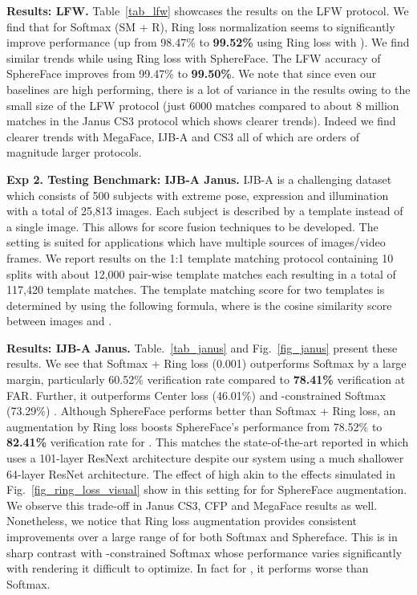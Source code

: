 \documentclass[10pt,twocolumn,letterpaper]{article}
\begin{document}
\textbf{Results: LFW.}  Table~\ref{tab_lfw} showcases the results on the LFW protocol. We find that for Softmax (SM + R), Ring loss normalization seems to significantly improve performance (up from 98.47\% to \textbf{99.52\%} using Ring loss with ). We find similar trends while using Ring loss with SphereFace. The LFW accuracy of SphereFace improves from 99.47\% to \textbf{99.50\%}. We note that since even our baselines are high performing, there is a lot of variance in the results owing to the small size of the LFW protocol (just 6000 matches compared to about 8 million matches in the Janus CS3 protocol which shows clearer trends). Indeed we find clearer trends with MegaFace, IJB-A and CS3 all of which are orders of magnitude larger protocols.











\textbf{Exp 2. Testing Benchmark: IJB-A Janus.} IJB-A \cite{klare2015pushing} is a challenging dataset which consists of 500 subjects with  extreme pose, expression and illumination with a total of 25,813 images. Each subject is described by a template instead of a single image. This allows for score fusion techniques to be developed. The setting is suited for applications which have multiple sources of images/video frames. We report results on the 1:1 template matching protocol containing 10 splits with about 12,000 pair-wise template matches each resulting in a total of 117,420 template matches. The template matching score for two templates  is determined by using the following formula,  where  is the cosine similarity score between images  and . 




\textbf{Results: IJB-A Janus.} Table.~\ref{tab_janus} and Fig.~\ref{fig_janus} present these results. We see that Softmax + Ring loss (0.001) outperforms Softmax by a large margin, particularly 60.52\% verification rate compared to \textbf{78.41\%} verification at  FAR. Further, it outperforms Center loss \cite{wen2016discriminative} (46.01\%) and -constrained Softmax (73.29\%)  \cite{ranjan2017l2}. Although SphereFace performs better than Softmax + Ring loss, an augmentation by Ring loss boosts SphereFace's performance from 78.52\% to \textbf{82.41\%} verification rate for . This matches the state-of-the-art reported in \cite{ranjan2017l2} which uses a 101-layer ResNext architecture despite our system using a much shallower 64-layer ResNet architecture. The effect of high  akin to the effects simulated in Fig.~\ref{fig_ring_loss_visual} show in this setting for  for SphereFace augmentation. We observe this trade-off in Janus CS3, CFP and MegaFace results as well. Nonetheless, we notice that Ring loss augmentation provides consistent improvements over a large range of  for both Softmax and Sphereface. This is in sharp contrast with  -constrained Softmax whose performance varies significantly with  rendering it difficult to optimize. In fact for , it performs worse than Softmax. 
\end{document}

